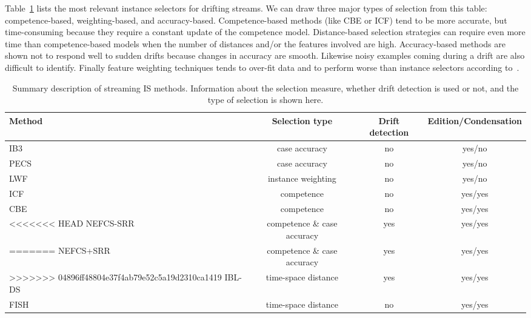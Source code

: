 \documentclass[preprint,12pt]{elsarticle}
\begin{document}
\begin{itemize}
\begin{itemize}
\end{itemize}

Table~\ref{tab:instance} lists the most relevant instance selectors for drifting streams. We can draw three major types of selection from this table: competence-based, weighting-based, and accuracy-based. Competence-based methods (like CBE or ICF) tend to be more accurate, but time-consuming because they require a constant update of the competence model. Distance-based selection strategies can require even more time than competence-based models when the number of distances and/or the features involved are high. Accuracy-based methods are shown not to respond well to sudden drifts because changes in accuracy are smooth. Likewise noisy examples coming during a drift are also difficult to identify. Finally feature weighting techniques tends to over-fit data and to perform worse than instance selectors according to~\cite{klinken04}.

\begin{table}[!htp]
\renewcommand{\arraystretch}{1.3}
\centering
\scriptsize
\caption{Summary description of streaming IS methods. Information about the selection measure, whether drift detection is used or not, and the type of selection is shown here.}
\label{tab:instance}
\begin{tabular}{ lccc }
\toprule
{\bf Method} & {\bf Selection type} & {\bf Drift detection} & {\bf Edition/Condensation} \\
\midrule
IB3~\cite{aha91} & case accuracy & no & yes/no\\
PECS~\cite{salga97} & case accuracy & no & yes/no\\
LWF~\cite{salga93} & instance weighting & no & yes/no\\
ICF~\cite{brighton02} & competence & no & yes/yes\\
CBE~\cite{delany05} & competence & no & yes/yes\\
<<<<<<< HEAD
NEFCS-SRR~\cite{lu16} & competence \& case accuracy & yes & yes/yes\\
=======
NEFCS+SRR~\cite{lu16} & competence \& case accuracy & yes & yes/yes\\
>>>>>>> 04896ff48804e37f4ab79e52c5a19d2310ca1419
IBL-DS~\cite{berin07} & time-space distance & yes & yes/yes\\
FISH~\cite{zlio11} & time-space distance & no & yes/yes\\
\bottomrule
\end{tabular}
\end{table}


\end{itemize}
\end{document}
